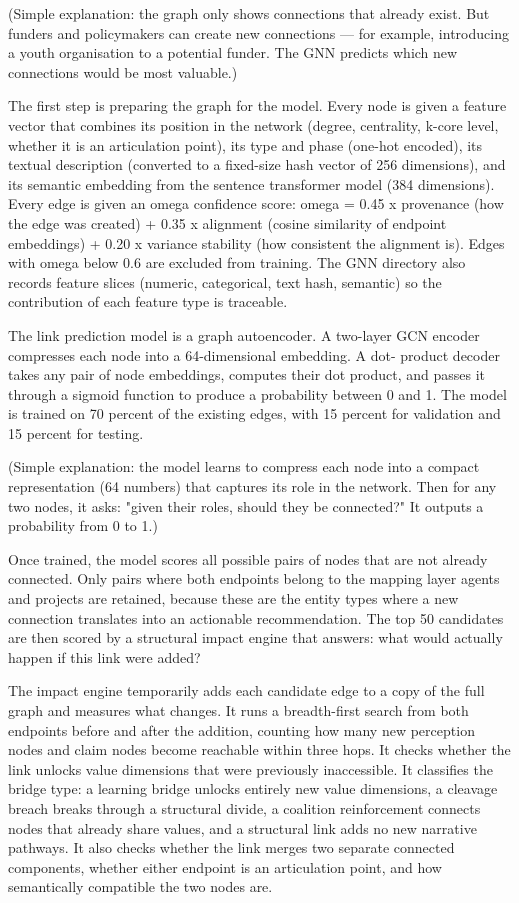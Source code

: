 \documentclass[11pt,a4paper]{article}
\begin{document}
(Simple explanation: the graph only shows connections that already exist.
But funders and policymakers can create new connections — for example,
introducing a youth organisation to a potential funder. The GNN predicts
which new connections would be most valuable.)

The first step is preparing the graph for the model. Every node is given
a feature vector that combines its position in the network (degree,
centrality, k-core level, whether it is an articulation point), its type
and phase (one-hot encoded), its textual description (converted to a
fixed-size hash vector of 256 dimensions), and its semantic embedding
from the sentence transformer model (384 dimensions). Every edge is
given an omega confidence score: omega = 0.45 x provenance (how the edge
was created) + 0.35 x alignment (cosine similarity of endpoint
embeddings) + 0.20 x variance stability (how consistent the alignment
is). Edges with omega below 0.6 are excluded from training. The GNN
directory also records feature slices (numeric, categorical, text hash,
semantic) so the contribution of each feature type is traceable.

The link prediction model is a graph autoencoder. A two-layer GCN
encoder compresses each node into a 64-dimensional embedding. A dot-
product decoder takes any pair of node embeddings, computes their dot
product, and passes it through a sigmoid function to produce a
probability between 0 and 1. The model is trained on 70 percent of the
existing edges, with 15 percent for validation and 15 percent for
testing.

(Simple explanation: the model learns to compress each node into a
compact representation (64 numbers) that captures its role in the
network. Then for any two nodes, it asks: "given their roles, should
they be connected?" It outputs a probability from 0 to 1.)

Once trained, the model scores all possible pairs of nodes that are not
already connected. Only pairs where both endpoints belong to the mapping
layer agents and projects are retained, because these are the entity
types where a new connection translates into an actionable
recommendation. The top 50 candidates are then scored by a structural
impact engine that answers: what would actually happen if this link were
added?

The impact engine temporarily adds each candidate edge to a copy of the
full graph and measures what changes. It runs a breadth-first search
from both endpoints before and after the addition, counting how many new
perception nodes and claim nodes become reachable within three hops. It
checks whether the link unlocks value dimensions that were previously
inaccessible. It classifies the bridge type: a learning bridge unlocks
entirely new value dimensions, a cleavage breach breaks through a
structural divide, a coalition reinforcement connects nodes that already
share values, and a structural link adds no new narrative pathways. It
also checks whether the link merges two separate connected components,
whether either endpoint is an articulation point, and how semantically
compatible the two nodes are.
\end{document}
